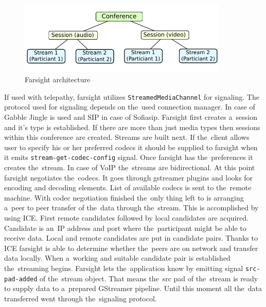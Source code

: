\begin{figure}[ht]
	\begin{center}
	\includegraphics[width=10cm]{fig/farsight-diagram.pdf}
	\caption{Farsight architecture}
	\label{fig:farsightDiagram}
\end{center}
\end{figure}

If used with telepathy, farsight utilizes \verb|StreamedMediaChannel| for signaling. The protocol used for signaling depends on the~used connection manager. In case of Gabble Jingle is used and SIP in case of Sofiasip. Farsight first creates a~session and it's type is established. If there are more than just media types then sessions within this conference are created. Streams are built next. If the~client allows user to specify his or her preferred codecs it should be supplied to farsight when it emits \verb|stream-get-codec-config| signal. Once farsight has the~preferences it creates the~stream. In case of VoIP the~streams are bidirectional. At this point farsight negotiates the~codecs. It goes through gstreamer plugins and looks for encoding and decoding elements. List of available codecs is sent to the~remote machine. With codec negotiation finished the~only thing left to is arranging a~peer to peer transfer of the~data through the~stream. This is accomplished by using ICE. First remote candidates followed by local candidates are acquired. Candidate is an~IP address and port where the~participant might be able to receive data. Local and remote candidates are put in candidate pairs. Thanks to ICE farsight is able to determine whether the~peers are on network and transfer data locally. When a~working and suitable candidate pair is established the~streaming begins. Farsight lets the~application know by emitting signal \verb|src-pad-added| of the~stream object. That means the~src pad of the~stream is ready to supply data to a~prepared GStreamer pipeline. Until this moment all the~data transferred went through the~signaling protocol. 


